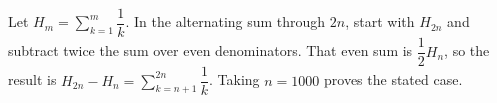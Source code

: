 Let $H_m=\sum_{k=1}^m\dfrac{1}{k}$. In the alternating sum through $2n$, start with $H_{2n}$ and subtract twice the sum over even denominators. That even sum is $\dfrac{1}{2}H_n$, so the result is $H_{2n}-H_n=\sum_{k=n+1}^{2n}\dfrac{1}{k}$. Taking $n=1000$ proves the stated case.
